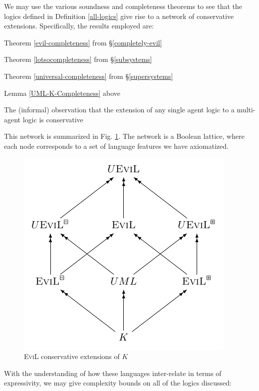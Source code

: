We may use the various soundness and completeness theorems to see that
the logics defined in Definition \ref{all-logics} give rise to a
network of conservative extensions.  Specifically, the results
employed are:
\begin{bul} 
\item Theorem \ref{evil-completeness} from \S\ref{completely-evil}
\item Theorem \ref{lotsocompleteness} from \S\ref{subsystems}
\item Theorem \ref{universal-completeness} from \S\ref{supersystems}
\item Lemma \ref{UML-K-Completeness} above
\item The (informal) observation that the extension 
of any single agent logic to
  a multi-agent logic is conservative
\end{bul}
  This network is summarized in
Fig. \ref{conservative-extensions}. The network is a Boolean lattice,
where each node corresponds to a set of language features
we have axiomatized.

\begin{figure}[ht]
\begin{center}
\includegraphics[]{logics/evils.pdf}
\end{center}
\caption{\textsc{EviL} conservative extensions of $K$}
\label{conservative-extensions}
\end{figure}

With the understanding of how these languages inter-relate in terms of
expressivity, we may give complexity bounds on all of the logics discussed:

